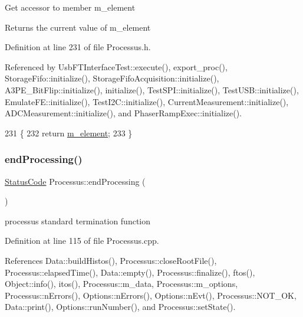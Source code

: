 Get accessor to member m\+\_\+element \begin{DoxyReturn}{Returns}
the current value of m\+\_\+element 
\end{DoxyReturn}


Definition at line 231 of file Processus.\+h.



Referenced by Usb\+F\+T\+Interface\+Test\+::execute(), export\+\_\+proc(), Storage\+Fifo\+::initialize(), Storage\+Fifo\+Acquisition\+::initialize(), A3\+P\+E\+\_\+\+Bit\+Flip\+::initialize(), initialize(), Test\+S\+P\+I\+::initialize(), Test\+U\+S\+B\+::initialize(), Emulate\+F\+E\+::initialize(), Test\+I2\+C\+::initialize(), Current\+Measurement\+::initialize(), A\+D\+C\+Measurement\+::initialize(), and Phaser\+Ramp\+Exec\+::initialize().


\begin{DoxyCode}
231                       \{
232     \textcolor{keywordflow}{return} \hyperlink{classProcessus_aa9d24d53c3e52f36786cabb5d8e296e7}{m\_element};
233   \}
\end{DoxyCode}
\mbox{\label{classProcessus_a5e4da662989d356b89d490b89c7afbfd}} 
\subsubsection{\texorpdfstring{end\+Processing()}{endProcessing()}}
{\footnotesize\ttfamily \hyperlink{classStatusCode}{Status\+Code} Processus\+::end\+Processing (\begin{DoxyParamCaption}{ }\end{DoxyParamCaption})\hspace{0.3cm}{\ttfamily [inherited]}}

processus standard termination function 

Definition at line 115 of file Processus.\+cpp.



References Data\+::build\+Histos(), Processus\+::close\+Root\+File(), Processus\+::elapsed\+Time(), Data\+::empty(), Processus\+::finalize(), ftos(), Object\+::info(), itos(), Processus\+::m\+\_\+data, Processus\+::m\+\_\+options, Processus\+::n\+Errors(), Options\+::n\+Errors(), Options\+::n\+Evt(), Processus\+::\+N\+O\+T\+\_\+\+OK, Data\+::print(), Options\+::run\+Number(), and Processus\+::set\+State().




